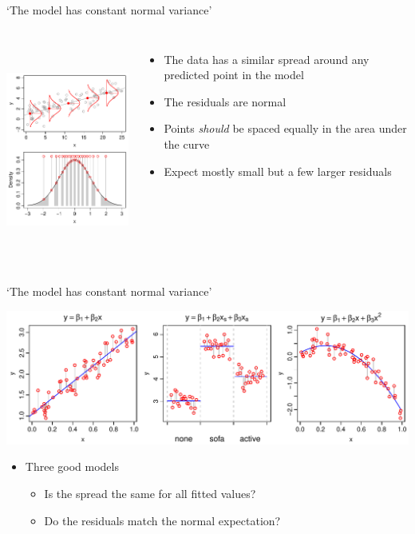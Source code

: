 \documentclass[xcolor=x11names,compress]{beamer}
\renewcommand{\(}{\begin{columns}}
\renewcommand{\)}{\end{columns}}
\newcommand{\<}[1]{\begin{column}{#1}}
\renewcommand{\>}{\end{column}}
\begin{document}
\begin{frame}{`The model has constant normal variance'}
\begin{columns}[T]

		\includegraphics[height=72mm]{ResidDemo.pdf}
		
		\begin{itemize}
		\item The data has a similar spread around any predicted point in the model
		\vspace{2cm}
		\item The residuals are normal
		\item Points {\it should} be spaced equally in the area under the curve
		\item Expect mostly small but a few larger residuals
		\end{itemize}
		
\end{columns}
\end{frame}


\begin{frame}{`The model has constant normal variance'}

\includegraphics[width=\textwidth]{ConstantVarianceMods.pdf}

\begin{itemize}
\item Three good models
\begin{itemize}
\item Is the spread the same for all fitted values?
\item Do the residuals match the normal expectation?
\end{itemize}
\end{itemize}

\end{frame}
\end{document}
